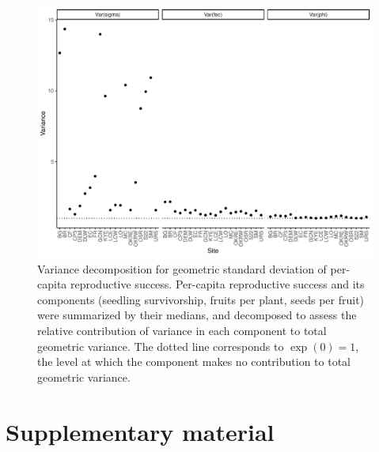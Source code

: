 \documentclass[12pt, oneside, titlepage]{article}   	%
\begin{document}
{\begin{figure}[!h]
       \includegraphics[width=\textwidth]{../figures/analysis/variance-decomp.pdf}  
    \caption{ Variance decomposition for geometric standard deviation of per-capita reproductive success. Per-capita reproductive success and its components (seedling survivorship, fruits per plant, seeds per fruit) were summarized by their medians, and decomposed to assess the relative contribution of variance in each component to total geometric variance. The dotted line corresponds to $\exp(0)=1$, the level at which the component makes no contribution to total geometric variance. }
\end{figure}

 


\clearpage
\section*{Supplementary material}


}
\end{document}
